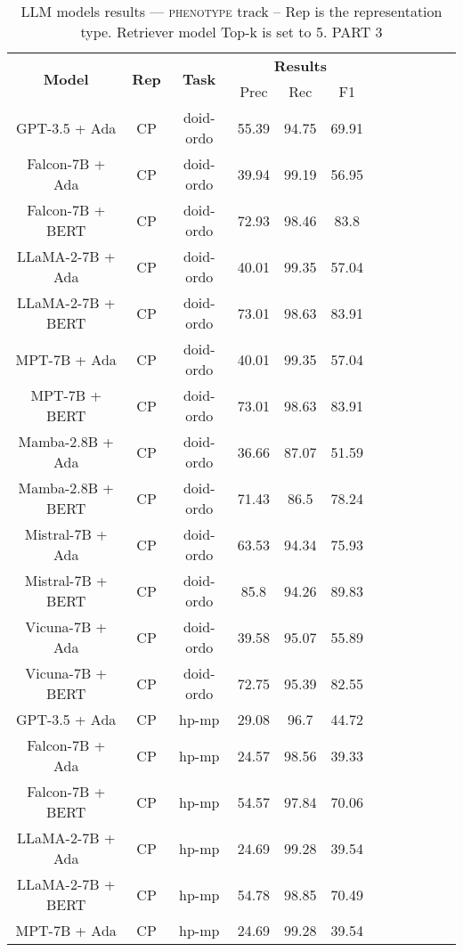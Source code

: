 \begin{table}
        \centering
        \small
        \caption{LLM models results --- \textsc{phenotype} track -- Rep is the representation type. Retriever model Top-k is set to 5. PART 3 } \label{tab:llm_phenotype3}
        \begin{tabular}{|c|c|c|c|c|c|c|c|c|c|c|c|}
            \hline
             \multirow{2}{*}{\textbf{Model}}  & \multirow{2}{*}{\textbf{Rep}}  & \multirow{2}{*}{\textbf{Task}} &  \multicolumn{3}{c|}{\textbf{Results}} \\
             \cline{4-6}
              & & & Prec & Rec & F1  \\
            \hline
	GPT-3.5 + Ada  & CP & doid-ordo  &  55.39 &  94.75 & 69.91  \\
	Falcon-7B + Ada  & CP & doid-ordo  &  39.94 &  99.19 & 56.95  \\
	Falcon-7B + BERT  & CP & doid-ordo  &  72.93 &  98.46 & 83.8  \\
	LLaMA-2-7B + Ada  & CP & doid-ordo  &  40.01 &  99.35 & 57.04  \\
	LLaMA-2-7B + BERT  & CP & doid-ordo  &  73.01 &  98.63 & 83.91  \\
	MPT-7B + Ada  & CP & doid-ordo  &  40.01 &  99.35 & 57.04  \\
	MPT-7B + BERT  & CP & doid-ordo  &  73.01 &  98.63 & 83.91  \\
	Mamba-2.8B + Ada  & CP & doid-ordo  &  36.66 &  87.07 & 51.59  \\
	Mamba-2.8B + BERT  & CP & doid-ordo  &  71.43 &  86.5 & 78.24  \\
	Mistral-7B + Ada  & CP & doid-ordo  &  63.53 &  94.34 & 75.93  \\
	Mistral-7B + BERT  & CP & doid-ordo  &  85.8 &  94.26 & 89.83  \\
	Vicuna-7B + Ada  & CP & doid-ordo  &  39.58 &  95.07 & 55.89  \\
	Vicuna-7B + BERT  & CP & doid-ordo  &  72.75 &  95.39 & 82.55  \\
	\hline
	GPT-3.5 + Ada  & CP & hp-mp  &  29.08 &  96.7 & 44.72  \\
	Falcon-7B + Ada  & CP & hp-mp  &  24.57 &  98.56 & 39.33  \\
	Falcon-7B + BERT  & CP & hp-mp  &  54.57 &  97.84 & 70.06  \\
	LLaMA-2-7B + Ada  & CP & hp-mp  &  24.69 &  99.28 & 39.54  \\
	LLaMA-2-7B + BERT  & CP & hp-mp  &  54.78 &  98.85 & 70.49  \\
	MPT-7B + Ada  & CP & hp-mp  &  24.69 &  99.28 & 39.54  \\

\end{tabular}
\end{table}
